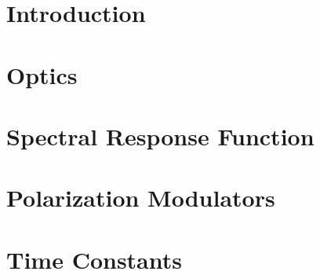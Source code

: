 \documentclass[
12pt, %
letterpaper, %
oneside, %
headinclude,footinclude, %
BCOR5mm, %
]{scrartcl}
\begin{document}

\section{Introduction}


\section{Optics}
%















\section{Spectral Response Function}



\section{Polarization Modulators}


















%

\section{Time Constants}




\end{document}
